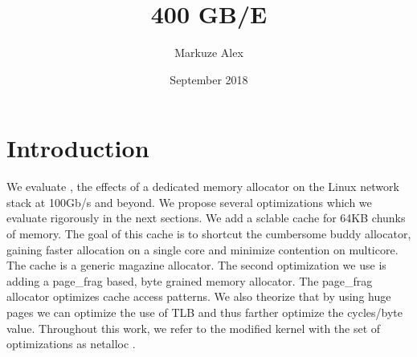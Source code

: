\documentclass[sigplan,10pt]{acmart}
\title{400 GB/E}
\author{Markuze Alex}
\date{September 2018}
\newcommand{\oursys}{netalloc }
\begin{document}
\maketitle
\section{Introduction}
We evaluate , the effects of a dedicated memory allocator on the Linux network stack at 100Gb/s and beyond.
We propose several optimizations which we evaluate rigorously in the next sections. We add a sclable cache for 64KB chunks of memory. The goal of this cache is to shortcut the cumbersome buddy allocator, gaining faster allocation on a single core and minimize contention on multicore. The cache is a generic magazine allocator.
The second optimization we use is adding a page\_frag based, byte grained memory allocator. The page\_frag allocator optimizes cache access patterns.
We also theorize that by using huge pages we can optimize the use of TLB and thus farther optimize the cycles/byte value.
Throughout this work, we refer to the modified kernel with the set of optimizations as \oursys.

\newpage

\renewcommand\footnotetextcopyrightpermission[1]{}
\end{document}
